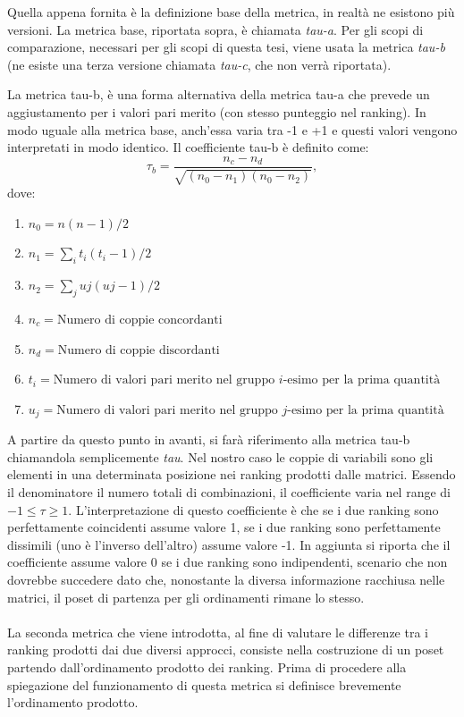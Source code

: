 \documentclass{report}
\begin{document}
Quella appena fornita è la definizione base della metrica, in realtà ne esistono più versioni. La metrica base, riportata sopra, è chiamata \textit{tau-a}. Per gli scopi di comparazione, necessari per gli scopi di questa tesi, viene usata la metrica \textit{tau-b} (ne esiste una terza versione chiamata \textit{tau-c}, che non verrà riportata).

\begin{definition}[$\tau_b$]
La metrica tau-b, è una forma alternativa della metrica tau-a che prevede un aggiustamento per i valori pari merito (con stesso punteggio nel ranking). In modo uguale alla metrica base, anch'essa varia tra -1 e +1 e questi valori vengono interpretati in modo identico.
Il coefficiente tau-b è definito come:
\[\tau_b = \frac{n_c - n_d}{\sqrt{(n_0 - n_1)(n_0 - n_2)}},\]
dove:
\begin{enumerate}
  \item[] $n_0 = n(n-1)/2$
  \item[] $n_1 = \sum_i t_i(t_i -1)/2$
  \item[] $n_2 =\sum_j uj(uj-1)/2$
  \item[] $n_c = \text{Numero di coppie concordanti}$
  \item[] $n_d = \text{Numero di coppie discordanti}$
  \item[] $t_i = \text{Numero di valori pari merito nel gruppo $i$-esimo per la prima quantità}$
  \item[] $u_j = \text{Numero di valori pari merito nel gruppo $j$-esimo per la prima quantità}$
\end{enumerate}
\end{definition}

A partire da questo punto in avanti, si farà riferimento alla metrica tau-b chiamandola semplicemente \textit{tau}.
Nel nostro caso le coppie di variabili sono gli elementi in una determinata posizione nei ranking prodotti dalle matrici.
Essendo il denominatore il numero totali di combinazioni, il coefficiente varia nel range di $-1\leq \tau \geq 1$. L'interpretazione di questo coefficiente è che se i due ranking sono perfettamente coincidenti assume valore 1, se i due ranking sono perfettamente dissimili (uno è l'inverso dell'altro) assume valore -1. In aggiunta si riporta che il coefficiente assume valore 0 se i due ranking sono indipendenti, scenario che non dovrebbe succedere dato che, nonostante la diversa informazione racchiusa nelle matrici, il poset di partenza per gli ordinamenti rimane lo stesso.
\\~\\
La seconda metrica che viene introdotta, al fine di valutare le differenze tra i ranking prodotti dai due diversi approcci, consiste nella costruzione di un poset partendo dall'ordinamento prodotto dei ranking.
Prima di procedere alla spiegazione del funzionamento di questa metrica si definisce brevemente l'ordinamento prodotto.
\end{document}
